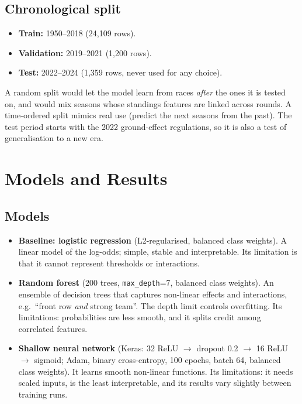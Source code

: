 \documentclass[11pt,a4paper]{article}
\newcommand{\ft}[1]{\texttt{#1}}
\begin{document}
\subsection{Chronological split}
\begin{itemize}
  \item \textbf{Train:} 1950--2018 (24,109 rows).
  \item \textbf{Validation:} 2019--2021 (1,200 rows).
  \item \textbf{Test:} 2022--2024 (1,359 rows, never used for any choice).
\end{itemize}
A random split would let the model learn from races \emph{after} the ones it is tested on, and would mix seasons whose standings features are linked across rounds. A time-ordered split mimics real use (predict the next seasons from the past). The test period starts with the 2022 ground-effect regulations, so it is also a test of generalisation to a new era.

\section{Models and Results}

\subsection{Models}
\begin{itemize}
  \item \textbf{Baseline: logistic regression} (L2-regularised, balanced class weights). A linear model of the log-odds; simple, stable and interpretable. Its limitation is that it cannot represent thresholds or interactions.
  \item \textbf{Random forest} (200 trees, \ft{max\_depth}=7, balanced class weights). An ensemble of decision trees that captures non-linear effects and interactions, e.g.\ ``front row \emph{and} strong team''. The depth limit controls overfitting. Its limitations: probabilities are less smooth, and it splits credit among correlated features.
  \item \textbf{Shallow neural network} (Keras: 32 ReLU $\to$ dropout 0.2 $\to$ 16 ReLU $\to$ sigmoid; Adam, binary cross-entropy, 100 epochs, batch 64, balanced class weights). It learns smooth non-linear functions. Its limitations: it needs scaled inputs, is the least interpretable, and its results vary slightly between training runs.
\end{itemize}
\end{document}
